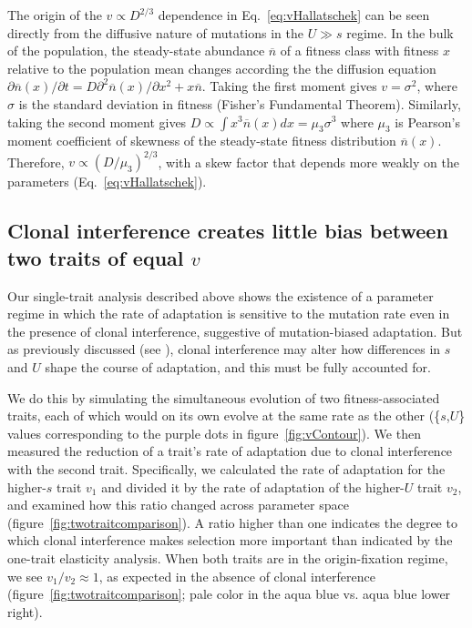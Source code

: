 \documentclass[9pt,twocolumn,twoside]{article}
\begin{document}
The origin of the $v\propto D^{2/3}$ dependence in Eq.~\eqref{eq:vHallatschek} can be seen directly from the diffusive nature of mutations in the $U\gg s$ regime. In the bulk of the population, the steady-state abundance $\overline{n}$ of a fitness class with fitness $x$ relative to the population mean changes according the the diffusion equation 
$\partial \overline{n}(x)/\partial t= D \partial^2 \overline{n}(x)/\partial x^2 + x \overline{n}$. Taking the first moment gives $v = \sigma^2$, where $\sigma$ is the standard deviation in fitness (Fisher's Fundamental Theorem). Similarly, taking the second moment gives $D \propto \int x^3 \overline{n}(x) dx = \mu_3 \sigma^3$ where $\mu_3$ is Pearson's moment coefficient of skewness of the steady-state fitness distribution $\overline{n}(x)$. Therefore, $v \propto (D/\mu_3)^{2/3}$, with a skew factor that depends more weakly on the parameters (Eq.~\eqref{eq:vHallatschek}).

\subsection{Clonal interference creates little bias between two traits of equal $v$} \label{subsec:results:2Dmutdrivadapt}

Our single-trait analysis described above shows the existence of a parameter regime in which the rate of adaptation is sensitive to the mutation rate even in the presence of clonal interference, suggestive of mutation-biased adaptation. But as previously discussed (see ), clonal interference may alter how differences in $s$ and $U$ shape the course of adaptation, and this must be fully accounted for. 

We do this by simulating the simultaneous evolution of two fitness-associated traits, each of which would on its own evolve at the same rate as the other (\{$s$,$U$\} values corresponding to the purple dots in figure~\ref{fig:vContour}). We then measured the reduction of a trait's rate of adaptation due to clonal interference with the second trait. Specifically, we calculated the rate of adaptation for the higher-$s$ trait $v_1$ and divided it by the rate of adaptation of the higher-$U$ trait $v_2$, and examined how this ratio changed across parameter space (figure~\ref{fig:twotraitcomparison}). A ratio higher than one indicates the degree to which clonal interference makes selection more important than indicated by the one-trait elasticity analysis. When both traits are in the origin-fixation regime, we see $v_1/v_2\approx 1$, as expected in the absence of clonal interference (figure~\ref{fig:twotraitcomparison}; pale color in the aqua blue vs. aqua blue lower right).
\end{document}
